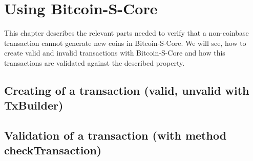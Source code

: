 \chapter{Using Bitcoin-S-Core}
\label{chap:using_bitcoins}
This chapter describes the relevant parts needed to verify that a non-coinbase transaction cannot generate new coins in Bitcoin-S-Core.
We will see, how to create valid and invalid transactions with Bitcoin-S-Core and how this transactions are validated against the described property.

\section{Creating of a transaction (valid, unvalid with TxBuilder)}

\section{Validation of a transaction (with method checkTransaction)}
